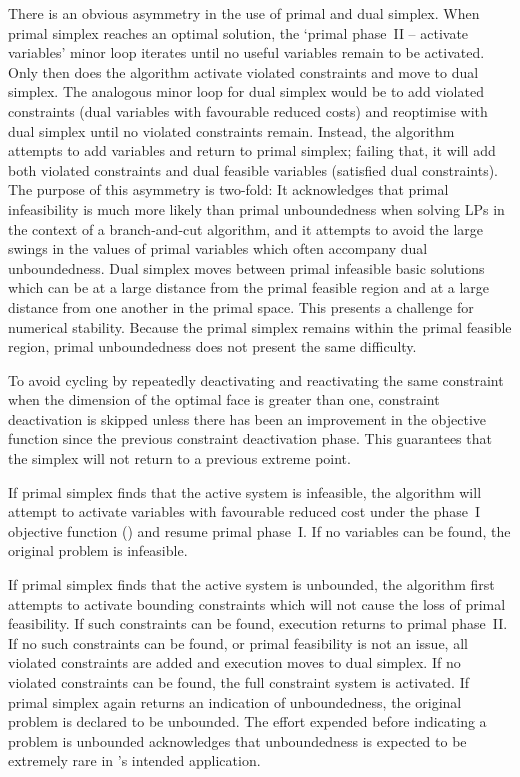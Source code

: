 There is an obvious asymmetry in the use of primal and dual simplex.
When primal simplex reaches an optimal solution, the
`primal phase~II -- activate variables' minor loop iterates until no useful
variables remain to be activated.
Only then does the algorithm activate violated constraints and move to dual
simplex.
The analogous minor loop for dual simplex would be to add violated constraints
(dual variables with favourable reduced costs) and reoptimise with dual
simplex until no violated constraints remain.
Instead, the algorithm attempts to add variables and return to primal simplex;
failing that, it will add both violated constraints and dual feasible
variables (satisfied dual constraints).
The purpose of this asymmetry is two-fold:
It acknowledges that primal infeasibility is much more likely than primal
unboundedness when solving LPs in the context of a branch-and-cut algorithm,
and it attempts to avoid the large swings in the values of primal variables
which often accompany dual unboundedness.
Dual simplex moves between primal infeasible basic
solutions which can be at a large distance from the primal feasible region and
at a large distance from one another in the primal space.
This presents a challenge for numerical stability.
Because the primal simplex remains within the primal feasible region,
primal unboundedness does not present the same difficulty.

To avoid cycling by repeatedly deactivating and reactivating the same
constraint when the dimension of the optimal face is greater than one,
constraint deactivation is skipped unless there has been an
improvement in the objective function since the previous constraint
deactivation phase.
This guarantees that the simplex will not return to a previous extreme
point.

If primal simplex finds that the active system is infeasible, the algorithm
will attempt to activate variables with favourable reduced cost under
the phase~I objective function (\vid {}) and
resume primal phase~I\@.
If no variables can be found, the original problem is infeasible.

If primal simplex finds that the active system is unbounded, the algorithm
first attempts to activate bounding constraints which will not cause the loss
of primal feasibility.
If such constraints can be found, execution returns to primal phase~II\@.
If no such constraints can be found, or primal feasibility is not an issue,
all violated constraints are added and execution moves to dual simplex.
If no violated constraints can be found, the full constraint system is
activated.
If primal simplex again returns an indication of unboundedness, the original
problem is declared to be unbounded.
The effort expended before indicating a problem is unbounded acknowledges
that unboundedness is expected to be extremely rare in \dylp's
intended application.

